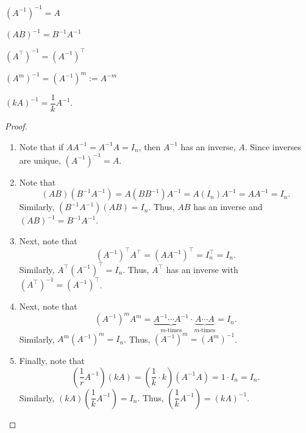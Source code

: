  \vspace{-0.1 in}
\begin{enumerate}[!THM!, start=1]
\begin{multicols}{3}
\item $(A^{-1})^{-1} = A$\\

\item $(AB)^{-1} = B^{-1}A^{-1}$\\

\item $(A^\top )^{-1} = (A^{-1})^\top $\\
\end{multicols}\vspace{-25 pt}
\begin{multicols}{2}
\item $(A^m)^{-1} = (A^{-1})^m := A^{-m}$\\

\item $(kA)^{-1} = \dfrac{1}{k}A^{-1}$.\\
\end{multicols}
\end{enumerate} \vspace{-25 pt}
\begin{proof}\mbox{}
\begin{enumerate}[!THM!, start=1]
\item Note that if $AA^{-1} = A^{-1}A = I_n$, then $A^{-1}$ has an inverse, $A$. Since inverses are unique, $(A^{-1})^{-1}  = A$.\\

\item Note that \[(AB)(B^{-1}A^{-1}) = A(BB^{-1})A^{-1} = A(I_n)A^{-1} = AA^{-1} = I_n.\] Similarly, $(B^{-1}A^{-1})(AB) = I_n$. Thus, $AB$ has an inverse and $(AB)^{-1} = B^{-1}A^{-1}$.\\

\item Next, note that \[(A^{-1})^\top A^\top  = (AA^{-1})^\top  = I_n^\top  = I_n.\] Similarly, $A^\top (A^{-1})^\top  = I_n$. Thus, $A^\top $ has an inverse with $(A^\top )^{-1} = (A^{-1})^\top $.\\

\item Next, note that \[(A^{-1})^mA^m = \underbrace{A^{-1}\cdots A^{-1}}_{m\text{-times}}\cdot\underbrace{A\cdots A}_{m\text{-times}} = I_n.\] Similarly, $A^m(A^{-1})^m = I_n$. Thus, $(A^{-1})^m = (A^m)^{-1}$.\\

\item Finally, note that \[\left(\dfrac{1}{r}A^{-1}\right)(kA) = \left(\dfrac{1}{k}\cdot k\right)(A^{-1}A) = 1\cdot I_n = I_n.\] Similarly, $(kA)\left(\dfrac{1}{k}A^{-1}\right) = I_n$. Thus, $\left(\dfrac{1}{k}A^{-1}\right) = (kA)^{-1}$.\hfill$\qedhere$
\end{enumerate}
\end{proof}\vs